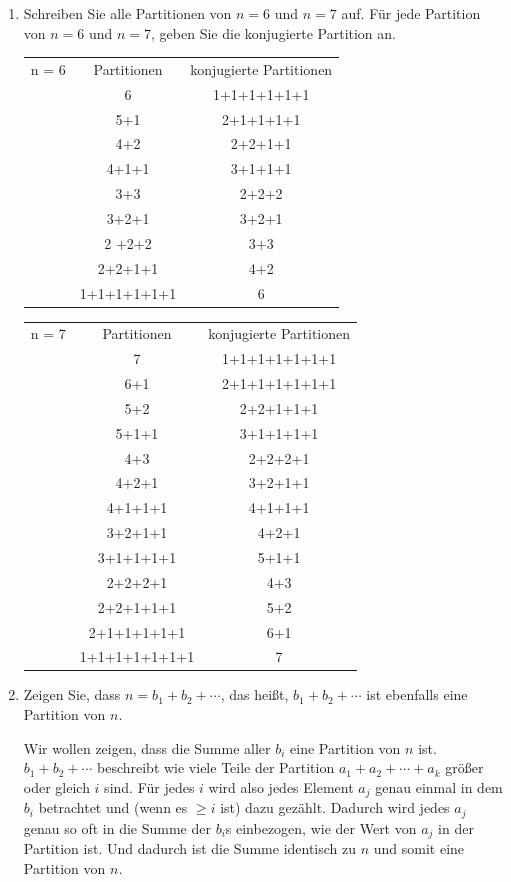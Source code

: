 \documentclass{article} %
\begin{document}
\begin{enumerate}
    \item[(a)] Schreiben Sie alle Partitionen von \(n = 6\) und \(n = 7\) auf. Für jede Partition von \(n = 6\) und \(n = 7\), geben Sie die konjugierte Partition an.
   \begin{mybox}
    \begin{tabular}{cc|c}
        n = 6 & Partitionen & konjugierte Partitionen\\
         & 6 & 1+1+1+1+1+1 \\
         & 5+1 & 2+1+1+1+1 \\
         & 4+2 & 2+2+1+1 \\
         & 4+1+1 & 3+1+1+1 \\
         & 3+3 & 2+2+2\\
         & 3+2+1  & 3+2+1\\
         & 2 +2+2 & 3+3 \\
         & 2+2+1+1&  4+2\\
         & 1+1+1+1+1+1 & 6\\
    \end{tabular}
    \end{mybox}
    \begin{mybox}
    \begin{tabular}{cc|c}
    n = 7 & Partitionen & konjugierte Partitionen\\
         & 7 &   1+1+1+1+1+1+1\\
         & 6+1& 2+1+1+1+1+1+1\\
         & 5+2& 2+2+1+1+1 \\
         & 5+1+1 & 3+1+1+1+1\\
         &4+3& 2+2+2+1 \\
         &4+2+1 & 3+2+1+1 \\
         & 4+1+1+1& 4+1+1+1 \\
         &3+2+1+1& 4+2+1\\
         & 3+1+1+1+1& 5+1+1 \\
         &2+2+2+1&4+3\\
         &2+2+1+1+1& 5+2 \\
         &2+1+1+1+1+1& 6+1\\
         & 1+1+1+1+1+1+1& 7\\
    \end{tabular} 
   \end{mybox}
    \item[(b)] Zeigen Sie, dass \(n = b_1 + b_2 + \cdots\), das heißt, \(b_1 + b_2 + \cdots\) ist ebenfalls eine Partition von \(n\).
    \begin{mybox}
    Wir wollen zeigen, dass die Summe aller $b_i$ eine Partition von $n$ ist. \\
    $b_1 + b_2 + \cdots$ beschreibt wie viele Teile der Partition $a_1 + a_2 + \cdots + a_k$ größer oder gleich $i$ sind. Für jedes $i$ wird also jedes Element $a_j$ genau einmal in dem $b_i$ betrachtet und (wenn es $\geq i$ ist) dazu gezählt. Dadurch wird jedes $a_j$ genau so oft in die Summe der $b_i$s einbezogen, wie der Wert von $a_j$ in der Partition ist. Und dadurch ist die Summe identisch zu $n$ und somit eine Partition von $n$.
    \end{mybox}
\end{enumerate}
\end{document}
